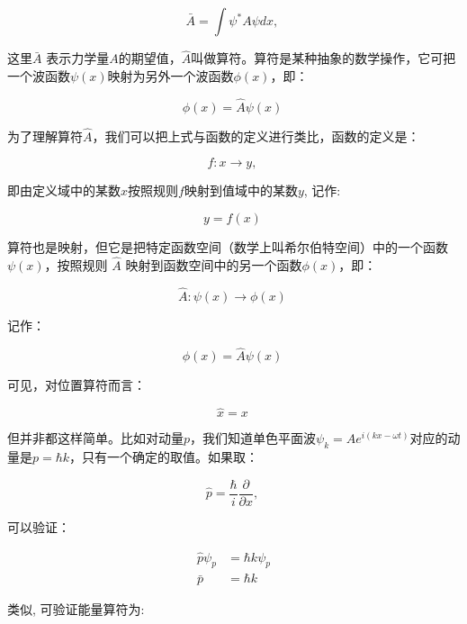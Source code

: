 \begin{equation}
\bar A = \int \psi^* A \psi dx,~
\end{equation}

这里$\bar A$ 表示力学量$A$的期望值，$\hat A$叫做算符。算符是某种抽象的数学操作，它可把一个波函数$\psi(x)$映射为另外一个波函数$\phi(x)$，即：

\begin{equation}
\phi(x) = \hat A \psi(x)~
\end{equation}

为了理解算符$\hat A$，我们可以把上式与函数的定义进行类比，函数的定义是：

\begin{equation}
f: x \to y ,~
\end{equation}

即由定义域中的某数$x$按照规则$f$映射到值域中的某数$y$, 记作: 

\begin{equation}
y = f(x)~
\end{equation}

算符也是映射，但它是把特定函数空间（数学上叫希尔伯特空间）中的一个函数$\psi(x)$，按照规则 $\hat A$ 映射到函数空间中的另一个函数$\phi(x)$，即：

\begin{equation}
\hat A: \psi(x) \to \phi(x)~
\end{equation}

记作：

\begin{equation}
\phi(x) = \hat A \psi(x)~
\end{equation}

可见，对位置算符而言：

\begin{equation}
\hat x = x~
\end{equation}

但并非都这样简单。比如对动量$p$，我们知道单色平面波$\psi_k = A e^{i(kx -\omega t)}$对应的动量是$p =\hbar
k$，只有一个确定的取值。如果取：

\begin{equation}
\hat p = \frac{\hbar}{i} \frac{\partial}{\partial x},~
\end{equation}

可以验证：

\begin{align}
\hat p \psi_p &= \hbar k \psi_p \\
\bar p &= \hbar k~
\end{align}

类似, 可验证能量算符为:

